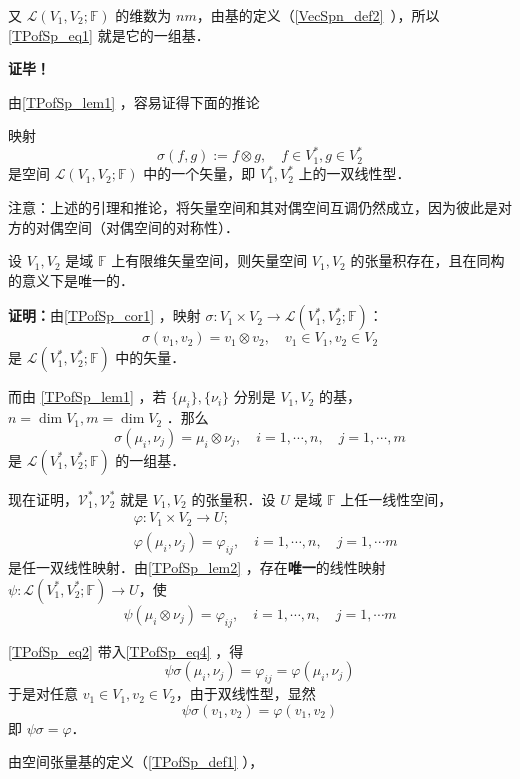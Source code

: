 又 $\mathcal L(V_1,V_2;\mathbb F)$ 的维数为 $nm$，由基的定义（\autoref{VecSpn_def2}~），所以\autoref{TPofSp_eq1} 就是它的一组基．

\textbf{证毕！}

由\autoref{TPofSp_lem1} ，容易证得下面的推论
\begin{corollary}{}\label{TPofSp_cor1}
映射
\begin{equation}
\sigma(f,g):=f\otimes g,\quad f\in V_1^*,g\in V_2^*
\end{equation}
是空间 $\mathcal L(V_1,V_2;\mathbb F)$ 中的一个矢量，即 $V_1^*,V_2^*$ 上的一双线性型．
\end{corollary}
注意：上述的引理和推论，将矢量空间和其对偶空间互调仍然成立，因为彼此是对方的对偶空间（对偶空间的对称性）．

\begin{theorem}{}
设 $V_1,V_2$ 是域 $\mathbb F$ 上有限维矢量空间，则矢量空间 $V_1,V_2$ 的张量积存在，且在同构的意义下是唯一的．
\end{theorem}
\textbf{证明：}由\autoref{TPofSp_cor1} ，映射 $\sigma:V_1\times V_2\rightarrow\mathcal L(V_1^*,V_2^*;\mathbb F) $：
\begin{equation}
\sigma(v_1,v_2)=v_1\otimes v_2,\quad v_1\in V_1,v_2\in V_2 
\end{equation}
是  $\mathcal L(V_1^*,V_2^*;\mathbb F)$ 中的矢量．

而由 \autoref{TPofSp_lem1} ，若 $\{\mu_i\},\{\nu_i\}$ 分别是 $V_1,V_2$ 的基，$n=\dim V_1,m=\dim V_2$ ．那么
\begin{equation}\label{TPofSp_eq2}
\sigma(\mu_i,\nu_j)=\mu_i\otimes \nu_j,\quad i=1,\cdots,n,\quad j=1,\cdots,m
\end{equation}
是 $\mathcal L(V_1^*,V_2^*;\mathbb F)$ 的一组基．

现在证明，$\mathcal{V_1^*,V_2^*}$ 就是 $V_1,V_2$ 的张量积．设 $U$ 是域 $\mathbb F$ 上任一线性空间，
\begin{equation}\label{TPofSp_eq3}
\begin{aligned}
&\varphi:V_1\times V_2\rightarrow U;\\
&\varphi(\mu_i,\nu_j)=\varphi_{ij},\quad i=1,\cdots,n,\quad j=1,\cdots m
\end{aligned}
\end{equation}
是任一双线性映射．由\autoref{TPofSp_lem2} ，存在\textbf{唯一}的线性映射 $\psi:\mathcal L(V_1^*,V_2^*;\mathbb F)\rightarrow U$，使
\begin{equation}\label{TPofSp_eq4}
\psi(\mu_i\otimes \nu_j)=\varphi_{ij},\quad i=1,\cdots,n,\quad j=1,\cdots m
\end{equation}

\autoref{TPofSp_eq2} 带入\autoref{TPofSp_eq4}  ，得
\begin{equation}
\psi\sigma(\mu_i,\nu_j)=\varphi_{ij}=\varphi(\mu_i,\nu_j)
\end{equation}
于是对任意 $v_1\in V_1,v_2\in V_2$，由于双线性型，显然
\begin{equation}
\psi\sigma(v_1,v_2)=\varphi(v_1,v_2)
\end{equation}
即 $\psi\sigma=\varphi$．

由空间张量基的定义（\autoref{TPofSp_def1} ），